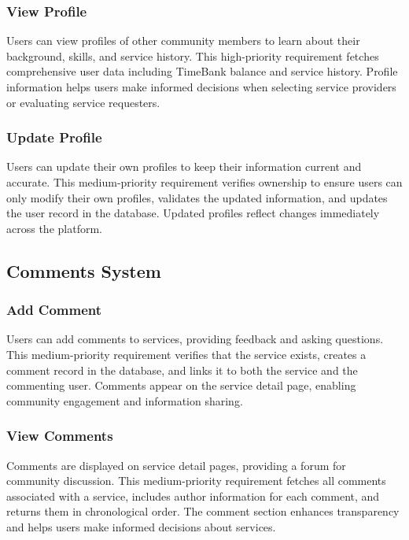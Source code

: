 \documentclass[12pt,a4paper]{report}
\begin{document}
\subsubsection{View Profile}

Users can view profiles of other community members to learn about their background, skills, and service history. This high-priority requirement fetches comprehensive user data including TimeBank balance and service history. Profile information helps users make informed decisions when selecting service providers or evaluating service requesters.

\subsubsection{Update Profile}

Users can update their own profiles to keep their information current and accurate. This medium-priority requirement verifies ownership to ensure users can only modify their own profiles, validates the updated information, and updates the user record in the database. Updated profiles reflect changes immediately across the platform.

\subsection{Comments System}

\subsubsection{Add Comment}

Users can add comments to services, providing feedback and asking questions. This medium-priority requirement verifies that the service exists, creates a comment record in the database, and links it to both the service and the commenting user. Comments appear on the service detail page, enabling community engagement and information sharing.

\subsubsection{View Comments}

Comments are displayed on service detail pages, providing a forum for community discussion. This medium-priority requirement fetches all comments associated with a service, includes author information for each comment, and returns them in chronological order. The comment section enhances transparency and helps users make informed decisions about services.
\end{document}
